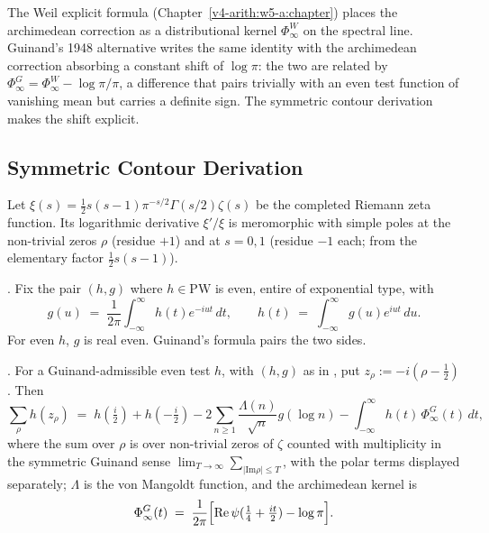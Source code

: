 The Weil explicit formula (Chapter~\ref{v4-arith:w5-a:chapter}) places the
archimedean correction as a distributional kernel \(\Phi_{\infty}^{W}\)
on the spectral line. Guinand's 1948 alternative writes the same
identity with the archimedean correction absorbing a constant shift of
\(\log\pi\): the two are related by
\(\Phi_{\infty}^{G}=\Phi_{\infty}^{W}-\log\pi/\pi\), a difference that
pairs trivially with an even test function of vanishing mean but carries
a definite sign. The symmetric contour derivation makes the shift
explicit.

\subsection{Symmetric Contour Derivation}
\label{v4-arith:w7-i:guinand:contour}

Let \(\xi(s)=\tfrac{1}{2}s(s-1)\pi^{-s/2}\Gamma(s/2)\zeta(s)\) be the
completed Riemann zeta function. Its logarithmic derivative
\(\xi'/\xi\) is meromorphic with simple poles at the non-trivial zeros
\(\rho\) (residue \(+1\)) and at \(s=0,1\) (residue \(-1\) each; from the
elementary factor \(\tfrac{1}{2}s(s-1)\)).

\begin{definition}
\label{v4-arith:w7-i:def:fourier-pair}
\ClaimStatusDefinitional. Fix the pair \((h,g)\) where \(h\in\mathrm{PW}\)
is even, entire of exponential type, with
\begin{equation}
\label{v4-arith:w7-i:eq:g-check}
g(u)\;=\;\frac{1}{2\pi}\int_{-\infty}^{\infty}h(t)e^{-iut}\,dt,
\qquad
h(t)\;=\;\int_{-\infty}^{\infty}g(u)e^{iut}\,du.
\end{equation}
For even \(h\), \(g\) is real even. Guinand's formula pairs the two sides.
\end{definition}

\begin{theorem}
\label{v4-arith:w7-i:thm:guinand-explicit}
\ClaimStatusProvedElsewhere. For a Guinand-admissible even test \(h\),
with
\((h,g)\) as in , put
\(z_{\rho}:=-i(\rho-\tfrac12)\). Then
\begin{equation}
\label{v4-arith:w7-i:eq:guinand}
\sum_{\rho}h(z_{\rho})
\;=\;h(\tfrac{i}{2})+h(-\tfrac{i}{2})
-2\sum_{n\geq 1}\frac{\Lambda(n)}{\sqrt n}g(\log n)
-\int_{-\infty}^{\infty}h(t)\,\Phi_{\infty}^{G}(t)\,dt,
\end{equation}
where the sum over \(\rho\) is over non-trivial zeros of \(\zeta\) counted
with multiplicity in the symmetric Guinand sense
\(\lim_{T\to\infty}\sum_{|\mathrm{Im}\rho|\leq T}\), with the polar
terms displayed separately; \(\Lambda\) is the von Mangoldt function, and the
archimedean kernel is
\begin{equation}
\label{v4-arith:w7-i:eq:guinand-arch}
\Phi_{\infty}^{G}(t)\;=\;\frac{1}{2\pi}\Bigl[\mathrm{Re}\,\psi(\tfrac14+\tfrac{it}{2})-\log\pi\Bigr].
\end{equation}
\end{theorem}

